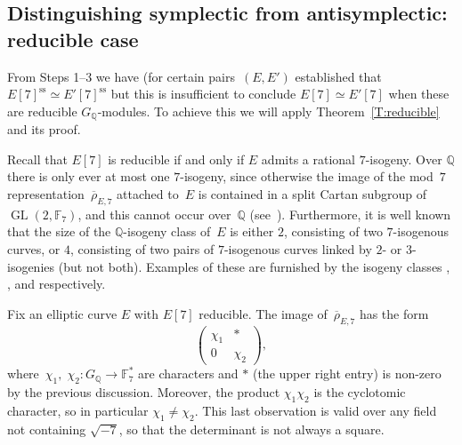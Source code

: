 \documentclass[12pt, reqno]{amsart}
\newcommand{\lmfdbeciso}[2]{\href{http://www.lmfdb.org/EllipticCurve/Q/#1/#2}{\text{\rm#1#2}}}
\newcommand{\F}{\mathbb{F}}
\newcommand{\Q}{\mathbb{Q}}
\newcommand{\rhobar}{{\overline{\rho}}}
\DeclareMathOperator{\sss}{ss}
\newcommand{\GL}{\operatorname{GL}}
\numberwithin{equation}{section}
\theoremstyle{definition}
\theoremstyle{remark}
\begin{document}
\subsection{Distinguishing symplectic from antisymplectic: reducible
  case}

From Steps 1--3 we have (for certain pairs~$(E,E')$ established that
$E[7]^{\sss} \simeq E'[7]^{\sss}$ but this is insufficient to conclude
$E[7] \simeq E'[7]$ when these are reducible $G_\Q$-modules.  To
achieve this we will apply Theorem~\ref{T:reducible} and its proof.

Recall that $E[7]$ is reducible if and only if $E$ admits a rational
$7$-isogeny.  Over $\Q$ there is only ever at most one $7$-isogeny,
since otherwise the image of the mod~$7$
representation~$\rhobar_{E,7}$ attached to~$E$ is contained in a split
Cartan subgroup of $\GL(2,\F_7)$, and this cannot occur over~$\Q$
(see~\cite[Theorem~1.1]{GL}).  Furthermore, it is well known that the
size of the $\Q$-isogeny class of~$E$ is either $2$, consisting of two
$7$-isogenous curves, or $4$, consisting of two pairs of $7$-isogenous
curves linked by $2$-{} or $3$-isogenies (but not both). Examples of
these are furnished by the isogeny classes \lmfdbeciso{26}{b},
\lmfdbeciso{49}{a}, and \lmfdbeciso{162}{b} respectively.

Fix an elliptic curve $E$ with $E[7]$ reducible. 
The image
of~$\rhobar_{E,7}$ has the form
\[
  \begin{pmatrix}\chi_1&*\\0&\chi_2  \end{pmatrix},
\]
where~$\chi_1, \; \chi_2 : G_{\Q}\to\F_7^*$ are characters and $*$
(the upper right entry) is non-zero by the previous
discussion. Moreover, the product $\chi_1\chi_2$ is the cyclotomic
character, so in particular $\chi_1\not=\chi_2$. This last observation
is valid over any field not containing $\sqrt{-7}$, so that the
determinant is not always a square.
\end{document}
